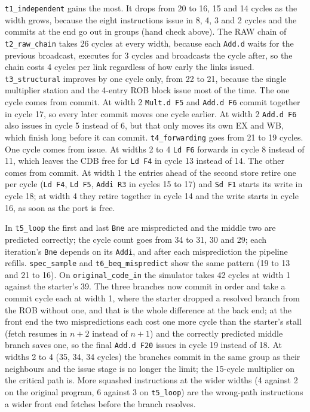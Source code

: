 \documentclass[11pt]{article}
\newcommand{\code}[1]{\texttt{#1}}
\begin{document}
\begin{table}[htbp]
\centering
\caption{Cycles, IPC, branches and mispredictions per test and issue width (commit width =
issue width, one CDB). Final registers and memory are the same at every width.}
\label{tab:summary}
\small

\end{table}

\code{t1\_independent} gains the most. It drops from 20 to 16, 15 and
14 cycles as the width grows, because the eight instructions issue in 8, 4, 3 and 2 cycles
and the commits at the end go out in groups (hand check above). The RAW chain of
\code{t2\_raw\_chain} takes 26 cycles at every width, because each \code{Add.d} waits for
the previous broadcast, executes for 3 cycles and broadcasts the cycle after, so the chain
costs 4 cycles per link regardless of how early the links issued. \code{t3\_structural}
improves by one cycle only, from 22 to 21, because the single multiplier station and the
4-entry ROB block issue most of the time. The one cycle comes from commit. At width 2
\code{Mult.d F5} and \code{Add.d F6} commit together in cycle 17, so every later commit
moves one cycle earlier. At width 2 \code{Add.d F6} also issues in cycle 5 instead of 6, but
that only moves its own EX and WB, which finish long before it can commit.
\code{t4\_forwarding} goes from 21 to 19 cycles. One cycle comes from issue. At widths 2 to
4 \code{Ld F6} forwards in cycle 8 instead of 11, which leaves the CDB free for \code{Ld F4}
in cycle 13 instead of 14. The other comes from commit. At width 1 the entries ahead of the
second store retire one per cycle (\code{Ld F4}, \code{Ld F5}, \code{Addi R3} in cycles 15
to 17) and \code{Sd F1} starts its write in cycle 18; at width 4 they retire together in
cycle 14 and the write starts in cycle 16, as soon as the port is free.

In \code{t5\_loop} the first and last
\code{Bne} are mispredicted and the middle two are predicted correctly; the cycle count
goes from 34 to 31, 30 and 29; each iteration's \code{Bne} depends on its \code{Addi}, and
after each misprediction the pipeline refills.
\code{spec\_sample} and \code{t6\_beq\_mispredict} show the same pattern (19 to 13 and 21
to 16). On \code{original\_code\_in} the simulator takes 42 cycles at width 1 against the
starter's 39. The three branches now commit in order and take a commit cycle each at width
1, where the starter dropped a resolved branch from the ROB without one, and that is the
whole difference at the back end; at the front end the two mispredictions each cost one more
cycle than the starter's stall (fetch resumes in $n+2$ instead of $n+1$) and the correctly
predicted middle branch saves one, so the final \code{Add.d F20} issues in cycle 19 instead
of 18. At widths 2 to 4 (35, 34, 34 cycles) the branches commit in the same group as their
neighbours and the issue stage is no longer the limit; the 15-cycle multiplier on the
critical path is. More squashed instructions at the wider widths (4 against 2 on the
original program, 6 against 3 on \code{t5\_loop}) are the wrong-path instructions a wider
front end fetches before the branch resolves.
\end{document}
